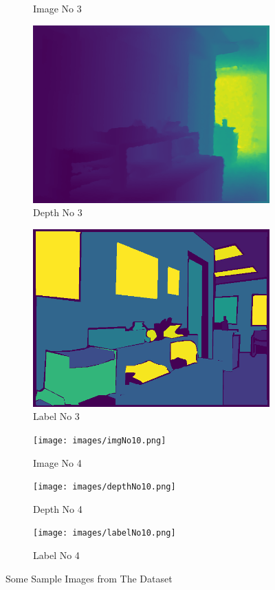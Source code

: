 \documentclass[a4paper, openany]{book}
\begin{document}
\begin{figure}[ht]
\begin{subfigure}[b]{0.3\linewidth}
    \caption{Image No 3}
  \end{subfigure}
  \begin{subfigure}[b]{0.3\linewidth}
    \includegraphics[width=\linewidth]{images/depthNo8.png}
    \caption{Depth No 3}
  \end{subfigure}
    \begin{subfigure}[b]{0.3\linewidth}
    \includegraphics[width=\linewidth]{images/labelNo8.png}
    \caption{Label No 3}
  \end{subfigure}
   \begin{subfigure}[b]{0.3\linewidth}
    \texttt{[image: images/imgNo10.png]}
    \caption{Image No 4}
  \end{subfigure}
  \begin{subfigure}[b]{0.3\linewidth}
    \texttt{[image: images/depthNo10.png]}
    \caption{Depth No 4}
  \end{subfigure}
    \begin{subfigure}[b]{0.3\linewidth}
    \texttt{[image: images/labelNo10.png]}
    \caption{Label No 4}
  \end{subfigure}
  \caption{Some Sample Images from The Dataset}
  \label{fig:sample_datas}
\end{figure}
\end{document}
